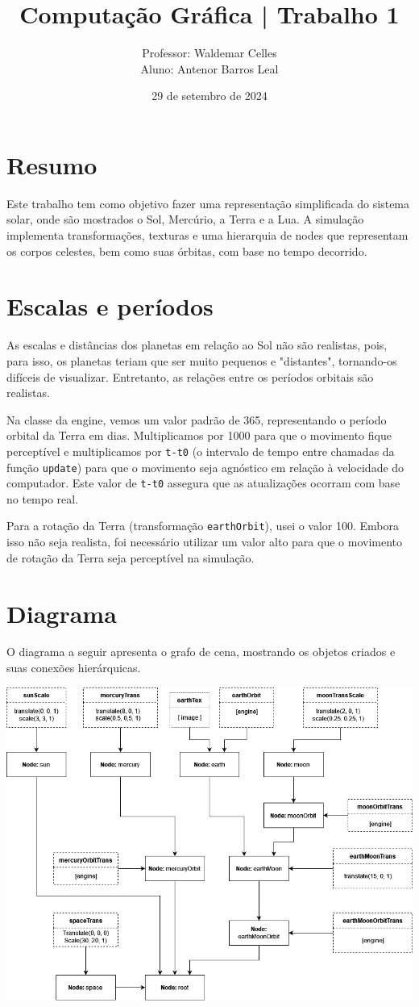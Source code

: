 \documentclass[11pt, a4paper]{article}
\title{Computação Gráfica | Trabalho 1}
\author{Professor: Waldemar Celles\\
Aluno: Antenor Barros Leal}
\date{29 de setembro de 2024}
\begin{document}
\maketitle

\section {Resumo}
Este trabalho tem como objetivo fazer uma representação simplificada do sistema 
solar, onde são mostrados o Sol, Mercúrio, a Terra e a Lua. A simulação 
implementa transformações, texturas e uma hierarquia de nodes que representam os
 corpos celestes, bem como suas órbitas, com base no tempo decorrido.

\section {Escalas e períodos}

As escalas e distâncias dos planetas em relação ao Sol não são realistas, pois, 
para isso, os planetas teriam que ser muito pequenos e "distantes", tornando-os 
difíceis de visualizar. Entretanto, as relações entre os períodos orbitais são 
realistas.

Na classe da engine, vemos um valor padrão de 365, representando o período 
orbital da Terra em dias. Multiplicamos por 1000 para que o movimento fique 
perceptível e multiplicamos por \texttt{t-t0} (o intervalo de tempo entre 
chamadas da função \texttt{update}) para que o movimento seja agnóstico em 
relação à velocidade do computador. Este valor de \texttt{t-t0} assegura que as 
atualizações ocorram com base no tempo real.

Para a rotação da Terra (transformação \texttt{earthOrbit}), usei o valor 100. 
Embora isso não seja realista, foi necessário utilizar um valor alto para que o 
movimento de rotação da Terra seja perceptível na simulação.

\section {Diagrama}

O diagrama a seguir apresenta o grafo de cena, mostrando os objetos criados e 
suas conexões hierárquicas.

\includegraphics[width=0.8\linewidth]{Trab1Graph.png}
\end{document}

